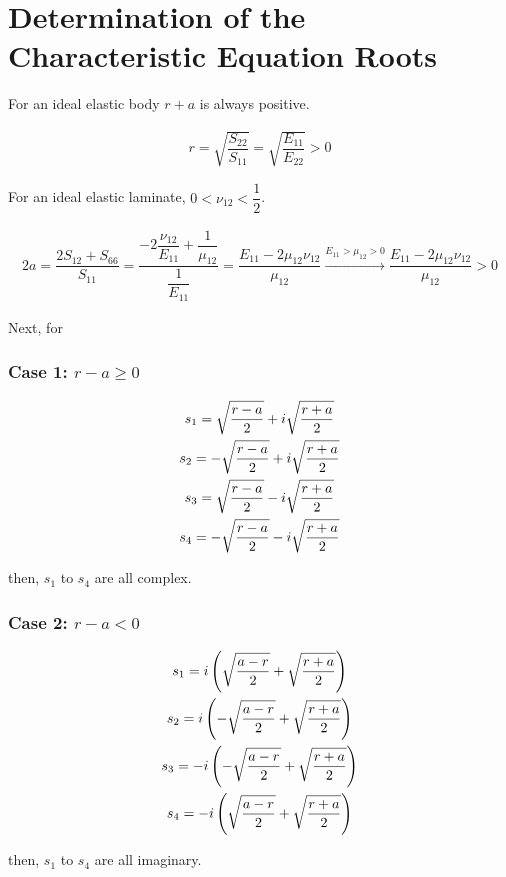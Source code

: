 \section{Determination of the Characteristic Equation Roots}\label{app:complex_imag_roots}
For an ideal elastic body $r+a$ is always positive.

\begin{gather*}
    r = \sqrt{\dfrac{S_{22}}{S_{11}}} = \sqrt{\dfrac{E_{11}}{E_{22}}} > 0
\end{gather*}

For an ideal elastic laminate, $0<\nu_{12}<\dfrac{1}{2}$.

\begin{gather*}
    2a = \dfrac{2S_{12} + S_{66}}{S_{11}} = \dfrac{-2\dfrac{\nu_{12}}{E_{11}} + \dfrac{1}{\mu_{12}}}{\dfrac{1}{E_{11}}} = \dfrac{E_{11} - 2 \mu_{12} \nu_{12}}{\mu_{12}} \xrightarrow[]{E_{11}>\mu_{12}>0} \dfrac{E_{11} - 2 \mu_{12} \nu_{12}}{\mu_{12}} > 0
\end{gather*}

Next, for 

\subsubsection*{Case 1: \texorpdfstring{$r - a\geq 0$}{}}

\begin{gather}
    s_1 = \sqrt{\dfrac{r-a}{2}} + i \sqrt{\dfrac{r+a}{2}} \notag\\
    s_2 = -\sqrt{\dfrac{r-a}{2}} + i \sqrt{\dfrac{r+a}{2}} \notag\\
    s_3 = \sqrt{\dfrac{r-a}{2}} - i \sqrt{\dfrac{r+a}{2}} \notag\\
    s_4 = -\sqrt{\dfrac{r-a}{2}} - i \sqrt{\dfrac{r+a}{2}}
    \label{eq:s1_s4_complex}
\end{gather}

then, $s_1$ to $s_4$ are all complex.

\subsubsection*{Case 2: \texorpdfstring{$r - a < 0$}{}}

\begin{gather}
    s_1 = i \left( \sqrt{\dfrac{a-r}{2}} + \sqrt{\dfrac{r+a}{2}} \right) \notag\\
    s_2 = i \left( -\sqrt{\dfrac{a-r}{2}} + \sqrt{\dfrac{r+a}{2}} \right) \notag\\
    s_3 = -i \left( -\sqrt{\dfrac{a-r}{2}} + \sqrt{\dfrac{r+a}{2}} \right) \notag\\
    s_4 = -i \left( \sqrt{\dfrac{a-r}{2}} + \sqrt{\dfrac{r+a}{2}} \right)
    \label{eq:s1_s4_imaginary}
\end{gather}

then, $s_1$ to $s_4$ are all imaginary.